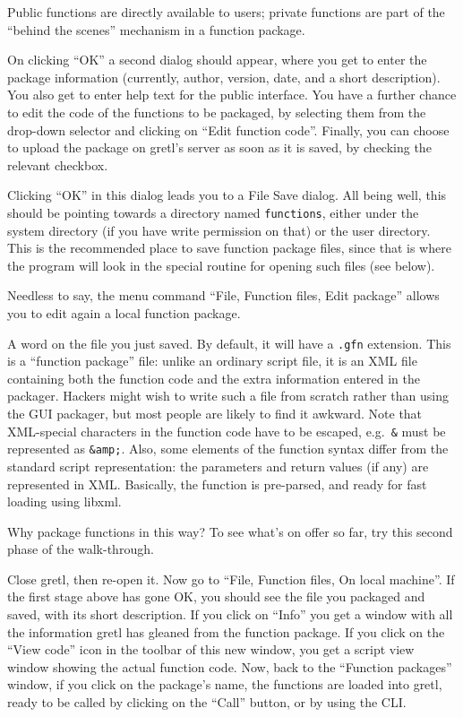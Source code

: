 Public functions are directly available to users; private functions are
part of the ``behind the scenes'' mechanism in a function package.

On clicking ``OK'' a second dialog should appear, where you get to
enter the package information (currently, author, version, date, and a
short description).  You also get to enter help text for the public
interface.  You have a further chance to edit the code of the functions
to be packaged, by selecting them from the drop-down selector and
clicking on ``Edit function code''. Finally, you can choose to upload
the package on gretl's server as soon as it is saved, by checking the
relevant checkbox.

Clicking ``OK'' in this dialog leads you to a File Save dialog.  All
being well, this should be pointing towards a directory named
\texttt{functions}, either under the  system directory (if
you have write permission on that) or the  user directory.
This is the recommended place to save function package files, since
that is where the program will look in the special routine for opening
such files (see below).

Needless to say, the menu command ``File, Function files, Edit package''
allows you to edit again a local function package.

\vspace{6pt}

A word on the file you just saved.  By default, it will have a
\texttt{.gfn} extension.  This is a ``function package'' file: unlike
an ordinary  script file, it is an XML file containing both
the function code and the extra information entered in the packager.
Hackers might wish to write such a file from scratch rather than using
the GUI packager, but most people are likely to find it awkward.  Note
that XML-special characters in the function code have to be escaped,
e.g.\ \texttt{\&} must be represented as \texttt{\&amp;}.  Also, some
elements of the function syntax differ from the standard script
representation: the parameters and return values (if any) are
represented in XML.  Basically, the function is pre-parsed, and ready
for fast loading using \textsf{libxml}.

\vspace{6pt}

Why package functions in this way?  To see what's on offer so far, try
this second phase of the walk-through.

Close gretl, then re-open it.  Now go to ``File, Function files, On
local machine''. If the first stage above has gone OK, you should
see the file you packaged and saved, with its short description.  If
you click on ``Info'' you get a window with all the information gretl
has gleaned from the function package.  If you click on the ``View
code'' icon in the toolbar of this new window, you get a script view
window showing the actual function code. Now, back to the ``Function
packages'' window, if you click on the package's name, the functions
are loaded into gretl, ready to be called by clicking on the ``Call''
button, or by using the CLI.

